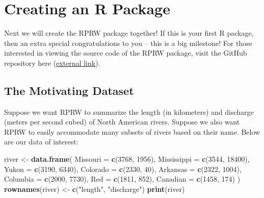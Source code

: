 \documentclass[
]{book}
\newenvironment{Shaded}{\begin{snugshade}}{\end{snugshade}}
\newcommand{\DataTypeTok}[1]{\textcolor[rgb]{0.13,0.29,0.53}{#1}}
\newcommand{\DecValTok}[1]{\textcolor[rgb]{0.00,0.00,0.81}{#1}}
\newcommand{\KeywordTok}[1]{\textcolor[rgb]{0.13,0.29,0.53}{\textbf{#1}}}
\newcommand{\NormalTok}[1]{#1}
\newcommand{\StringTok}[1]{\textcolor[rgb]{0.31,0.60,0.02}{#1}}
\begin{document}
\hypertarget{creating-an-r-package}{%
\section{Creating an R Package}\label{creating-an-r-package}}

Next we will create the RPRW package together! If this is your first R package, then an extra special congratulations to you -- this is a big milestone! For those interested in viewing the source code of the RPRW package, visit the GitHub repository here (\href{https://github.com/michaeldumelle/RPRW}{external link}).

\hypertarget{the-motivating-dataset}{%
\subsection{The Motivating Dataset}\label{the-motivating-dataset}}

Suppose we want RPRW to summarize the length (in kilometers) and discharge (meters per second cubed) of North American rivers. Suppose we also want RPRW to easily accommodate many subsets of rivers based on their name. Below are our data of interest:

\begin{Shaded}
\begin{Highlighting}[]
\NormalTok{river <-}\StringTok{ }\KeywordTok{data.frame}\NormalTok{(}
  \DataTypeTok{Missouri =} \KeywordTok{c}\NormalTok{(}\DecValTok{3768}\NormalTok{, }\DecValTok{1956}\NormalTok{),}
  \DataTypeTok{Mississippi =} \KeywordTok{c}\NormalTok{(}\DecValTok{3544}\NormalTok{, }\DecValTok{18400}\NormalTok{),}
  \DataTypeTok{Yukon =} \KeywordTok{c}\NormalTok{(}\DecValTok{3190}\NormalTok{, }\DecValTok{6340}\NormalTok{),}
  \DataTypeTok{Colorado =} \KeywordTok{c}\NormalTok{(}\DecValTok{2330}\NormalTok{, }\DecValTok{40}\NormalTok{),}
  \DataTypeTok{Arkansas =} \KeywordTok{c}\NormalTok{(}\DecValTok{2322}\NormalTok{, }\DecValTok{1004}\NormalTok{),}
  \DataTypeTok{Columbia =} \KeywordTok{c}\NormalTok{(}\DecValTok{2000}\NormalTok{, }\DecValTok{7730}\NormalTok{),}
  \DataTypeTok{Red =} \KeywordTok{c}\NormalTok{(}\DecValTok{1811}\NormalTok{, }\DecValTok{852}\NormalTok{),}
  \DataTypeTok{Canadian =} \KeywordTok{c}\NormalTok{(}\DecValTok{1458}\NormalTok{, }\DecValTok{174}\NormalTok{)}
\NormalTok{) }
\KeywordTok{rownames}\NormalTok{(river) <-}\StringTok{ }\KeywordTok{c}\NormalTok{(}\StringTok{"length"}\NormalTok{, }\StringTok{"discharge"}\NormalTok{)}
\KeywordTok{print}\NormalTok{(river)}
\end{Highlighting}
\end{Shaded}
\end{document}
